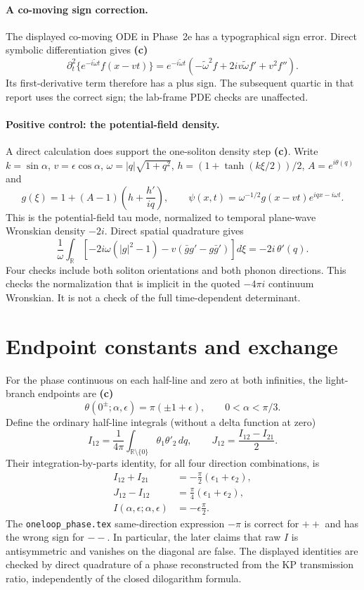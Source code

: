 \documentclass[11pt]{article}
\newcommand{\Lc}{\textbf{(c)}}
\begin{document}
\paragraph{A co-moving sign correction.}
The displayed co-moving ODE in Phase~2e has a typographical sign error.
Direct symbolic differentiation gives \Lc
\[
 \partial_t^2\{e^{-i\widetilde\omega t}f(x-vt)\}
 =e^{-i\widetilde\omega t}
 (-\widetilde\omega^2f+2iv\widetilde\omega f'+v^2f'').
\]
Its first-derivative term therefore has a plus sign. The subsequent quartic
in that report uses the correct sign; the lab-frame PDE checks are unaffected.

\paragraph{Positive control: the potential-field density.}
A direct calculation does support the one-soliton density step \Lc. Write
$k=\sin\alpha$, $v=\epsilon\cos\alpha$, $\omega=|q|\sqrt{1+q^2}$,
$h=(1+\tanh(k\xi/2))/2$, $A=e^{i\theta(q)}$ and
\[
 g(\xi)=1+(A-1)\left(h+\frac{h'}{iq}\right),\qquad
 \psi(x,t)=\omega^{-1/2}g(x-vt)e^{iqx-i\omega t}.
\]
This is the potential-field tau mode, normalized to temporal plane-wave
Wronskian density $-2i$. Direct spatial quadrature gives
\begin{equation}\label{eq:density}
 \frac1\omega\int_{\mathbb R}\!
 \left[-2i\omega(|g|^2-1)-v(\bar g g'-g\bar g')\right]d\xi
 =-2i\,\theta'(q). \tag{c}
\end{equation}
Four checks include both soliton orientations and both phonon directions.
This checks the normalization that is implicit in the quoted $-4\pi i$
continuum Wronskian. It is not a check of the full time-dependent determinant.

\section{Endpoint constants and exchange}
For the phase continuous on each half-line and zero at both infinities,
the light-branch endpoints are \Lc
\begin{equation}
 \theta(0^\pm;\alpha,\epsilon)=\pi(\pm1+\epsilon),
 \qquad 0<\alpha<\pi/3. \tag{c}
\end{equation}
Define the ordinary half-line integrals (without a delta function at zero)
\[
 I_{12}=\frac1{4\pi}\int_{\mathbb R\setminus\{0\}}\theta_1\theta'_2\,dq,
 \qquad J_{12}=\frac{I_{12}-I_{21}}2.
\]
Their integration-by-parts identity, for all four direction combinations, is
\begin{align}
 I_{12}+I_{21}&=-\frac\pi2(\epsilon_1+\epsilon_2),\tag{c}\\
 J_{12}-I_{12}&=\frac\pi4(\epsilon_1+\epsilon_2),\tag{c}\\
 I(\alpha,\epsilon;\alpha,\epsilon)&=-\epsilon\frac\pi2.\tag{c}
\end{align}
The \texttt{oneloop\_phase.tex} same-direction expression $-\pi$ is correct for
$++$ and has the wrong sign for $--$. In particular, the later claims that raw
$I$ is antisymmetric and vanishes on the diagonal are false. The displayed
identities are checked by direct quadrature of a phase reconstructed from the
KP transmission ratio, independently of the closed dilogarithm formula.
\end{document}
